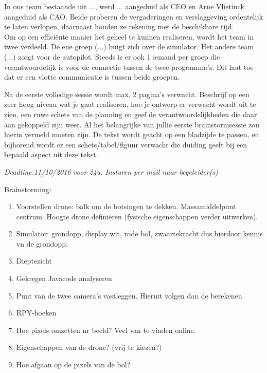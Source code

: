 \documentclass{peno-opdracht1}
\begin{document}
\maketitle

In ons team bestaande uit ..., werd ... aangeduid als CEO en Arne Vlietinck aangeduid als CAO. Beide proberen de vergaderingen en verslaggeving ordentelijk te laten verlopen, daarnaast houden ze rekening met de beschikbare tijd. \\
Om op een efficiënte manier het geheel te kunnen realiseren, wordt het team in twee verdeeld. De ene groep (...) buigt zich over de simulator. Het andere team  (...) zorgt voor de autopilot. Steeds is er ook 1 iemand per groep die verantwoordelijk is voor de connectie tussen de twee programma's. Dit laat toe dat er een vlotte communicatie is tussen beide groepen.



Na de eerste volledige sessie wordt max. 2 pagina's verwacht. Beschrijf op een zeer hoog
niveau wat je gaat realiseren, hoe je ontwerp er verwacht wordt uit te zien, een ruwe schets
van de planning en geef de verantwoordelijkheden die daar aan gekoppeld zijn weer. Al
het belangrijke van jullie eerste brainstormsessie zou hierin vermeld moeten zijn. De tekst
wordt geacht op een bladzijde te passen, en bijhorend wordt er een schets/tabel/figuur
verwacht die duiding geeft bij een bepaald aspect uit deze tekst.

\emph{Deadline:11/10/2016 voor 24u. Insturen per mail naar begeleider(s)}
\newline
\newline

Brainstorming: 
\begin{enumerate}
	
	\item Voorstellen drone: balk om de botsingen te dekken. Massamiddelpunt centrum. Hoogte drone defini\"eren (fysische eigenschappen verder uitwerken). 
	\item Simulator: grondopp, display wit, rode bol, zwaartekracht dus hierdoor kennis vn de grondopp.
	\newline
	\item Dieptezicht
	\item Gekregen Javacode analyseren
	\item Punt van de twee camera's vastleggen. Hieruit volgen dan de berekenen.
	\item RPY-hoeken 
	\item Hoe pixels omzetten nr beeld? Veel van te vinden online.
	\item Eigenschappen van de drone? (vrij te kiezen?)
	\item Hoe afgaan op de pixels van de bol? 
	
\end{enumerate}
\end{document}
